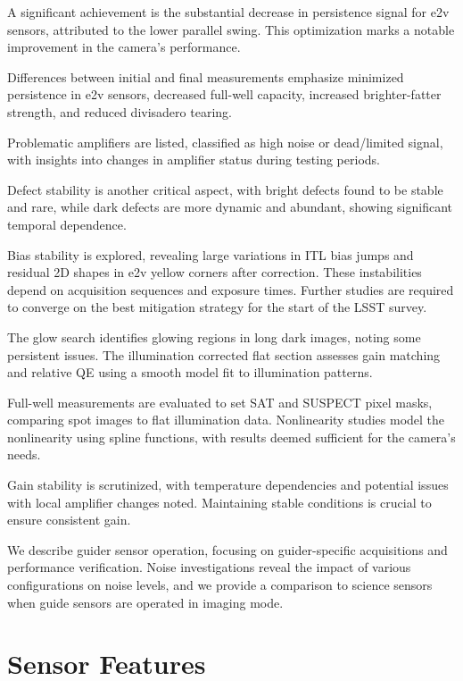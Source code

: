 A significant achievement is the substantial decrease in persistence signal for e2v sensors, attributed to the lower parallel swing. This optimization marks a notable improvement in the camera's performance.

Differences between initial and final measurements emphasize minimized persistence in e2v sensors, decreased full-well capacity, increased brighter-fatter strength, and reduced divisadero tearing.

Problematic amplifiers are listed, classified as high noise or dead/limited signal, with insights into changes in amplifier status during testing periods.

Defect stability is another critical aspect, with bright defects found to be stable and rare, while dark defects are more dynamic and abundant, showing significant temporal dependence.

Bias stability is explored, revealing large variations in ITL bias jumps and residual 2D shapes in e2v yellow corners after correction. These instabilities depend on acquisition sequences and exposure times. Further studies are required to converge on the best mitigation strategy for the start of the LSST survey.

The glow search identifies glowing regions in long dark images, noting some persistent issues. The illumination corrected flat section assesses gain matching and relative QE using a smooth model fit to illumination patterns.

Full-well measurements are evaluated to set SAT and SUSPECT pixel masks, comparing spot images to flat illumination data. Nonlinearity studies model the nonlinearity using spline functions, with results deemed sufficient for the camera's needs.

Gain stability is scrutinized, with temperature dependencies and potential issues with local amplifier changes noted. Maintaining stable conditions is crucial to ensure consistent gain.

We describe guider sensor operation, focusing on guider-specific acquisitions and performance verification. Noise investigations reveal the impact of various configurations on noise levels, and we provide a comparison to science sensors when guide sensors are operated in imaging mode.


\clearpage
\section{Sensor Features}\label{sensor-features}

